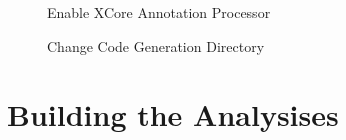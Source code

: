          \begin{figure}
             \centering
             \caption{Enable XCore Annotation Processor}
             \label{fig:enableSpecificSettings}
        \end{figure}    

         \begin{figure}
             \centering
             \caption{Change Code Generation Directory}
             \label{fig:modifySourceDir}
        \end{figure}    


\section{Building the Analysises}

